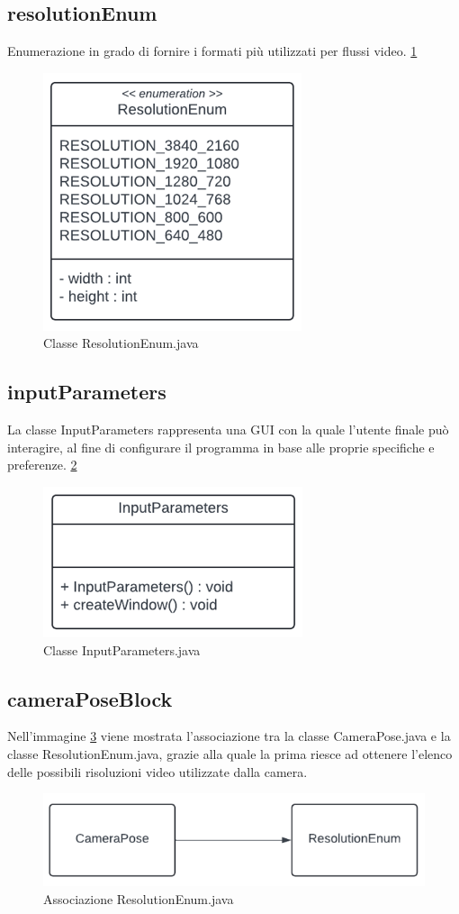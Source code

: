 \documentclass[12pt,a4paper,openright,twoside]{book}
\begin{document}
\subsection{resolutionEnum}
Enumerazione in grado di fornire i formati più utilizzati per flussi video. \ref{fig:resolution_enum}
\begin{figure}
	\centering
	\includegraphics[width=0.5\linewidth]{./figures/UML/resolutionEnum.png}
	\caption{Classe ResolutionEnum.java}
	\label{fig:resolution_enum}
\end{figure}
\subsection{inputParameters}
La classe InputParameters rappresenta una GUI con la quale l'utente finale può interagire, al fine di configurare il programma in base alle proprie specifiche e preferenze. \ref{fig:input_parameters}
\begin{figure}
	\centering
	\includegraphics[width=0.5\linewidth]{./figures/UML/inputParameters.png}
	\caption{Classe InputParameters.java}
	\label{fig:input_parameters}
\end{figure}
\subsection{cameraPoseBlock}
Nell'immagine \ref{fig:camera_pose_block} viene mostrata l'associazione tra la classe CameraPose.java e la classe ResolutionEnum.java, grazie alla quale la prima riesce ad ottenere l'elenco delle possibili risoluzioni video utilizzate dalla camera.
\begin{figure}
	\centering
	\includegraphics[width=0.5\linewidth]{./figures/UML/cameraPoseBlock.png}
	\caption{Associazione ResolutionEnum.java}
	\label{fig:camera_pose_block}
\end{figure}
\end{document}
